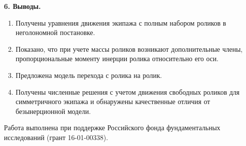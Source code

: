 





%





{\bf 6. Выводы.}
\begin{enumerate}[wide]
    \item Получены уравнения движения экипажа с полным набором роликов в неголономной постановке.

    \item Показано, что при учете массы роликов возникают дополнительные члены, пропорциональные моменту инерции ролика относительно его оси.

    \item Предложена модель перехода с ролика на ролик.

    \item Получены численные решения с учетом движения свободных роликов для симметричного экипажа и обнаружены качественные отличия от безынерционной модели.
\end{enumerate}

Работа выполнена при поддержке Российского фонда фундаментальных исследований (грант 16-01-00338).




% 


